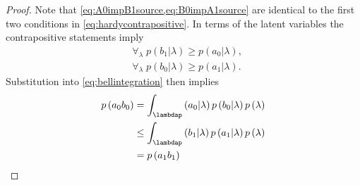 \begin{proof}
Note that \cref{eq:A0impB1source,eq:B0impA1source} are identical to the first two conditions in \cref{eq:hardycontrapositive}. In terms of the latent variables the contrapositive statements imply
\begin{align}
&\forall_{\lambda}\; %
p\left(b_1|\lambda\right)\geq p\left(a_0|\lambda\right) ,\label{eq:A0eqB1}
\\&\forall_{\lambda}\; 
p\left(b_0|\lambda\right)\geq p\left(a_1|\lambda\right).\label{eq:B0eqA1}
\end{align}
Substitution into \cref{eq:bellintegration} then implies
\begin{align}\begin{split}\label{eq:hardyintegrals}
p\left(a_0 b_0\right)&=\int_\lambda%
p\left(a_0|\lambda\right)p\left(b_0|\lambda\right)p\left(\lambda\right)\\
&\leq \int_\lambda%
p\left(b_1|\lambda\right)p\left(a_1|\lambda\right)p\left(\lambda\right)\\
&=p\left(a_1 b_1\right)\qedhere
\end{split}\end{align}
%
\end{proof}


